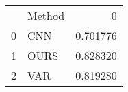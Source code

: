 \begin{tabular}{llr}
 & Method & 0 \\
0 & CNN & 0.701776 \\
1 & OURS & 0.828320 \\
2 & VAR & 0.819280 \\
\end{tabular}
